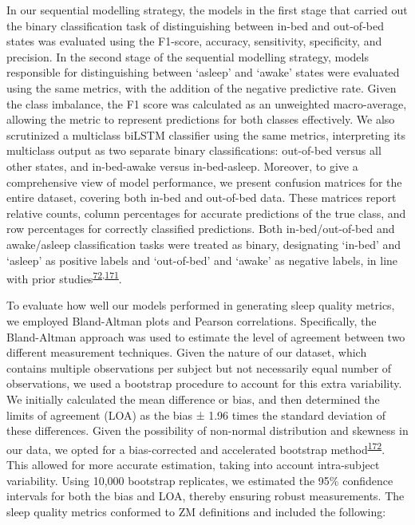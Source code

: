 \documentclass[
  10pt,
]{scrbook}
\begin{document}
In our sequential modelling strategy, the models in the first stage that
carried out the binary classification task of distinguishing between
in-bed and out-of-bed states was evaluated using the F1-score, accuracy,
sensitivity, specificity, and precision. In the second stage of the
sequential modelling strategy, models responsible for distinguishing
between `asleep' and `awake' states were evaluated using the same
metrics, with the addition of the negative predictive rate. Given the
class imbalance, the F1 score was calculated as an unweighted
macro-average, allowing the metric to represent predictions for both
classes effectively. We also scrutinized a multiclass biLSTM classifier
using the same metrics, interpreting its multiclass output as two
separate binary classifications: out-of-bed versus all other states, and
in-bed-awake versus in-bed-asleep. Moreover, to give a comprehensive
view of model performance, we present confusion matrices for the entire
dataset, covering both in-bed and out-of-bed data. These matrices report
relative counts, column percentages for accurate predictions of the true
class, and row percentages for correctly classified predictions. Both
in-bed/out-of-bed and awake/asleep classification tasks were treated as
binary, designating `in-bed' and `asleep' as positive labels and
`out-of-bed' and `awake' as negative labels, in line with prior
studies\textsuperscript{\protect\hyperlink{ref-hjorth_measure_2012}{72},\protect\hyperlink{ref-kushida_comparison_2001}{171}}.

To evaluate how well our models performed in generating sleep quality
metrics, we employed Bland-Altman plots and Pearson correlations.
Specifically, the Bland-Altman approach was used to estimate the level
of agreement between two different measurement techniques. Given the
nature of our dataset, which contains multiple observations per subject
but not necessarily equal number of observations, we used a bootstrap
procedure to account for this extra variability. We initially calculated
the mean difference or bias, and then determined the limits of agreement
(LOA) as the bias ± 1.96 times the standard deviation of these
differences. Given the possibility of non-normal distribution and
skewness in our data, we opted for a bias-corrected and accelerated
bootstrap
method\textsuperscript{\protect\hyperlink{ref-diciccio_bootstrap_1996}{172}}.
This allowed for more accurate estimation, taking into account
intra-subject variability. Using 10,000 bootstrap replicates, we
estimated the 95\% confidence intervals for both the bias and LOA,
thereby ensuring robust measurements. The sleep quality metrics
conformed to ZM definitions and included the following:
\end{document}
